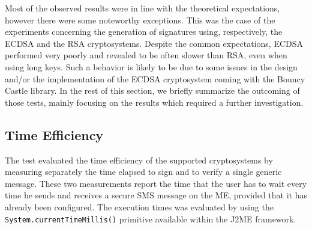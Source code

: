\documentclass[authoryear]{elsarticle}
\begin{document}
Most of the observed results were in line with the theoretical expectations, however there were some noteworthy exceptions. This was the case of the experiments concerning the generation of signatures using, respectively, the ECDSA and the RSA cryptosystems. Despite the common expectations, ECDSA performed very poorly  and revealed to be often slower than RSA, even when using long keys. Such a behavior is likely to be due to some issues in the design and/or the implementation of the ECDSA cryptosystem coming with the Bouncy Castle library. In the rest of this section, we briefly summarize the outcoming of those tests, mainly focusing on the results which required a further investigation.




%




\subsection{Time Efficiency}
The test evaluated the time efficiency of the supported cryptosystems by measuring separately the time elapsed to sign and to verify a single generic message. These two measurements report the time that the user has to wait every time he sends and receives a secure SMS message on the ME, provided that it has already been configured. The execution times was evaluated by using the {\tt System.currentTimeMillis()} primitive available within the J2ME framework.


\end{document}

